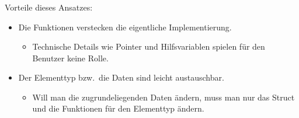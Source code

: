 \begin{frame}
\frametitle{\insertsection}
\begin{block}
{Vorteile dieses Ansatzes:}
\begin{itemize}
    \item Die Funktionen \alert{verstecken} die eigentliche Implementierung.
    \begin{itemize}
        \item Technische Details wie Pointer und Hilfsvariablen
            spielen für den Benutzer keine Rolle.
    \end{itemize}
    \item Der Elementtyp bzw.\ die Daten sind leicht austauschbar.
    \begin{itemize}
        \item Will man die zugrundeliegenden Daten ändern,
            muss man nur das Struct und die Funktionen für den Elementtyp ändern.
    \end{itemize}
\end{itemize}
\end{block}

\end{frame}

\endinput

\begin{frame}
\frametitle{\insertsection}
\begin{block}
{}
\end{block}
\end{frame}